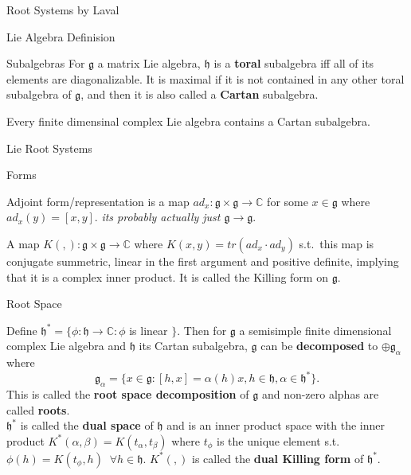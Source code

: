 \documentclass[12pt, letterpaper]{article}
\newcommand{\C}{\mathbb{C}}
\begin{document}
\begin{section}{Root Systems by Laval}
\begin{subsection}{Lie Algebra Definision}
\begin{subsubsection}{Subalgebras}
      For \(\mathfrak{g}\) a matrix Lie algebra, \(\mathfrak{h}\) is a
      \textbf{toral} subalgebra iff all of its elements are diagonalizable. It
      is maximal if it is not contained in any other toral subalgebra of
      \(\mathfrak{g}\), and then it is also called a \textbf{Cartan} subalgebra.

      Every finite dimensinal complex Lie algebra contains a Cartan subalgebra.

    \end{subsubsection}

  \end{subsection}

  \begin{subsection}{Lie Root Systems}

    \begin{subsubsection}{Forms}

      Adjoint form/representation is a map \(ad_{x} : \mathfrak{g} \times
      \mathfrak{g} \to \C\) for some \(x \in \mathfrak{g}\) where \(ad_{x}(y)
      = [x, y]\). \emph{its probably actually just
        \(\mathfrak{g} \to \mathfrak{g}\)}.

      A map \(K(,): \mathfrak{g} \times \mathfrak{g} \to \C\) where \(K(x, y) =
      tr(ad_{x} \cdot ad_{y})\) s.t.\ this map is conjugate summetric, linear in
      the first argument and positive definite, implying that it is a complex
      inner product. It is called the Killing form on \(\mathfrak{g}\).

    \end{subsubsection}

    \begin{subsubsection}{Root Space}

      Define \(\mathfrak{h}^{*} = \{\phi : \mathfrak{h} \to \C : \phi\) is
      linear \(\}\). Then for \(\mathfrak{g}\) a semisimple finite dimensional
      complex Lie algebra and \(\mathfrak{h}\) its Cartan subalgebra,
      \(\mathfrak{g}\) can be \textbf{decomposed} to
      \(\oplus \mathfrak{g}_{\alpha}\)
      where \[\mathfrak{g}_{\alpha} = \{x \in \mathfrak{g} :[h, x] =
        \alpha(h)x, h \in \mathfrak{h}, \alpha \in \mathfrak{h}^{*}\}.\]
      This is called the \textbf{root space decomposition} of \(\mathfrak{g}\)
      and non-zero alphas are called \textbf{roots}. \\

      \(\mathfrak{h}^{*}\) is called the \textbf{dual space} of \(\mathfrak{h}\)
      and is an inner product space with the inner product
      \(K^{*}(\alpha, \beta) = K(t_{\alpha}, t_{\beta})\) where \(t_{\phi}\) is
      the unique element s.t.\ \(\phi(h) = K(t_{\phi}, h) \;\;
      \forall h \in \mathfrak{h}\). \(K^{*}(,)\) is called the \textbf{dual
        Killing form} of \(\mathfrak{h}^{*}\).


\end{subsubsection}
\end{subsection}
\end{section}
\end{document}
